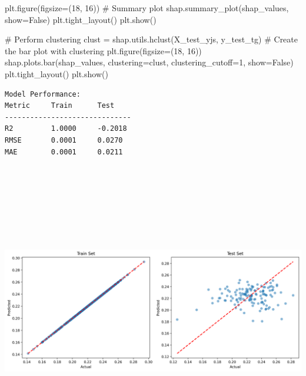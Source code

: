 \documentclass[
  letterpaper,
  DIV=11,
  numbers=noendperiod]{scrartcl}
\newenvironment{Shaded}{\begin{snugshade}}{\end{snugshade}}
\newcommand{\CommentTok}[1]{\textcolor[rgb]{0.37,0.37,0.37}{#1}}
\newcommand{\DecValTok}[1]{\textcolor[rgb]{0.68,0.00,0.00}{#1}}
\newcommand{\NormalTok}[1]{\textcolor[rgb]{0.00,0.23,0.31}{#1}}
\newcommand{\OperatorTok}[1]{\textcolor[rgb]{0.37,0.37,0.37}{#1}}
\newcommand{\VariableTok}[1]{\textcolor[rgb]{0.07,0.07,0.07}{#1}}
\begin{document}
\begin{Shaded}
\begin{Highlighting}[]
\NormalTok{plt.figure(figsize}\OperatorTok{=}\NormalTok{(}\DecValTok{18}\NormalTok{, }\DecValTok{16}\NormalTok{)) }
\CommentTok{\# Summary plot}
\NormalTok{shap.summary\_plot(shap\_values, show}\OperatorTok{=}\VariableTok{False}\NormalTok{)}
\NormalTok{plt.tight\_layout()}
\NormalTok{plt.show()}

\CommentTok{\# Perform clustering}
\NormalTok{clust }\OperatorTok{=}\NormalTok{ shap.utils.hclust(X\_test\_yjs, y\_test\_tg)}
\CommentTok{\# Create the bar plot with clustering}
\NormalTok{plt.figure(figsize}\OperatorTok{=}\NormalTok{(}\DecValTok{18}\NormalTok{, }\DecValTok{16}\NormalTok{)) }
\NormalTok{shap.plots.bar(shap\_values, clustering}\OperatorTok{=}\NormalTok{clust, clustering\_cutoff}\OperatorTok{=}\DecValTok{1}\NormalTok{, show}\OperatorTok{=}\VariableTok{False}\NormalTok{)}
\NormalTok{plt.tight\_layout()}
\NormalTok{plt.show()}
\end{Highlighting}
\end{Shaded}

\begin{verbatim}
Model Performance:
Metric     Train      Test      
------------------------------
R2         1.0000     -0.2018   
RMSE       0.0001     0.0270    
MAE        0.0001     0.0211    
\end{verbatim}

\includegraphics[width=12.38542in,height=5.11458in]{xgboost_tuned_files/figure-pdf/cell-41-output-2.png}
\end{document}
